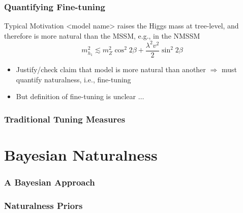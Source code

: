 \documentclass[10pt,aspectratio=169]{beamer}
\begin{document}
\begin{frame}
  \frametitle{Quantifying Fine-tuning}
  \begin{block}{Typical Motivation}
    <model name> raises the Higgs mass at tree-level, and
    therefore is more natural than the MSSM, e.g., in the NMSSM
    \begin{equation*}
      m_{h_1}^2 \lesssim m_Z^2 \cos^2 2\beta + \frac{\lambda^2 v^2}{2}
      \sin^2 2\beta
    \end{equation*}
  \end{block}
  \begin{itemize} \itemsep1em
  \item Justify/check claim that model is more natural than another
    $\Rightarrow$ must quantify naturalness, i.e., fine-tuning
  \item \alert{But definition of fine-tuning is unclear $\ldots$}
  \end{itemize}
\end{frame}

\begin{frame}
  \frametitle{Traditional Tuning Measures}
\end{frame}

\section{Bayesian Naturalness}

\begin{frame}
  \frametitle{A Bayesian Approach}
\end{frame}

\begin{frame}
  \frametitle{Naturalness Priors}
\end{frame}
\end{document}
